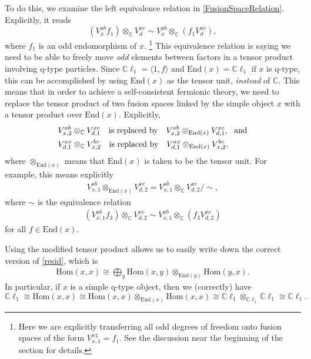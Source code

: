 \documentclass[12pt,a4paper]{article}
\newcommand{\tp}{\otimes}
\newcommand{\unit}{\mathds{1}}
\newcommand{\cc}{\mathbb{C}}
\newcommand\be            {\begin{equation}}
\newcommand\ee            {\end{equation}}
\newcommand\ba            {\begin{aligned}}
\newcommand\ea            {\end{aligned}}
\newcommand{\Hom}{\text{Hom}}
\newcommand{\End}{\text{End}}
\newcommand{\cl}{\mathbb{C}\ell}
\begin{document}
To do this, we examine the left equivalence relation in \eqref{FusionSpaceRelation}. 
Explicitly, it reads
\be (V^{ab}_x f_1) \tp_\cc V^{xc}_d \sim V^{ab}_x \tp_\cc (f_1 V^{xc}_d),\ee
where $f_1$ is an odd endomorphism of $x$.
\footnote{Here we are explicitly transferring all odd degrees of freedom onto fusion spaces of the form $V^{x\unit}_{x,1} = f_1$. See the discussion near the beginning of the section for details.}
This equivalence relation is saying we need to be able to freely move {\it odd} elements between factors in a tensor product involving q-type particles. 
Since $\cl_1 = \langle1,f\rangle$ and $\End(x) = \cl_1$ if $x$ is q-type, this can be accomplished by using $\End(x)$ as the tensor unit, {\it instead} of $\cc$. 
This means that in order to achieve a self-consistent fermionic theory, we need to replace the tensor product of two fusion spaces linked by the simple object $x$ with a tensor product over $\End(x)$. 
 Explicitly, 
\be \ba
 &V^{ab}_{x,2} \tp_{\mathbb{C}} V^{xc}_{d,1}\quad  \text{is replaced by} \quad V^{ab}_{x,2} \tp_{\text{End}(x)} V^{xc}_{d,1},\ \  {\rm and} \\ 
  &V^{ax}_{d,1} \tp_{\mathbb{C}} V^{bc}_{x,2}\quad  \text{is replaced by} \quad V^{ax}_{d,1} \tp_{\End(x)} V^{bc}_{x,2},
\ea 
\ee
where $\tp_{\End(x)}$ means that $\End(x)$ is taken to be the tensor unit. For example, this means explicitly  
\begin{align}
V^{ab}_{x,1} \tp_{\text{End}(x)} V^{xc}_{d,2} = V^{ab}_{x,1} \tp_{\mathbb{C}}V^{xc}_{d,2}/ \sim,
\label{qtensor}
\end{align}
where $\sim$ is the equivalence relation 
\begin{align} \label{equivreln}
(V^{ab}_{x,1} f_3) \tp_{\mathbb{C}}V^{xc}_{d,2} \sim V^{ab}_{x,1} \tp_{\mathbb{C}} (f_3 V^{xc}_{d,2})
\end{align}
for all $f \in \text{End}(x)$. 

Using the modified tensor product allows us to easily write down the correct version of \eqref{resid}, which is 
\begin{align}
\Hom(x,x) \cong \bigoplus_y \Hom(x,y) \tp_{\End(y)} \Hom(y,x).
\end{align}
In particular, if $x$ is a simple q-type object, then we (correctly) have \be
\cl_1 \cong \Hom(x,x) \cong \Hom(x,x)\tp_{\End(x)} \Hom(x,x) \cong \cl_1\tp_{\cl_1}\cl_1 \cong \cl_1.\ee  
\end{document}
